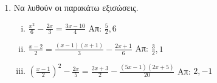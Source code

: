\begin{enumerate}
  \item Να λυθούν οι παρακάτω εξισώσεις.
    \begin{enumerate}[i)]
      \item $ \frac{x^{2}}{6} - \frac{2x}{3} = \frac{3x-10}{4} $ \hfill Απ: $
        \frac{5}{2}, 6 $
      \item $ \frac{x-2}{2} = \frac{(x-1)(x+1)}{3} - \frac{2x+1}{6} $ \hfill Απ: $
        \frac{3}{2}, 1 $ 
      \item $ \left(\frac{x-1}{2}\right)^{2} - \frac{2x}{5} = 
        \frac{2x+3}{2} - \frac{(5x-1)(2x+5)}{20} $ \hfill Απ: $ 2, -1 $ 
    \end{enumerate}
\end{enumerate}


